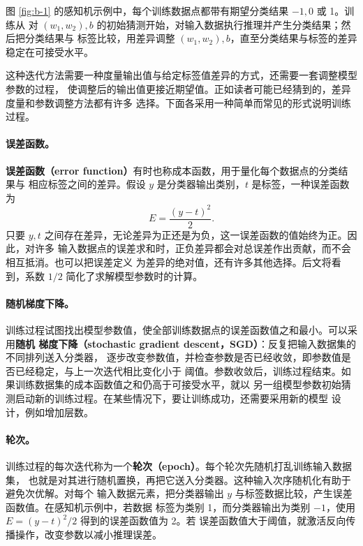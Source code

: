 图 \ref{fig:b-1} 的感知机示例中，每个训练数据点都带有期望分类结果 $-1,0$ 或 1。训练从
对 $(w_1,w_2),b$ 的初始猜测开始，对输入数据执行推理并产生分类结果；然后把分类结果与
标签比较，用差异调整 $(w_1,w_2),b$，直至分类结果与标签的差异稳定在可接受水平。

这种迭代方法需要一种度量输出值与给定标签值差异的方式，还需要一套调整模型参数的过程，
使调整后的输出值更接近期望值。正如读者可能已经猜到的，差异度量和参数调整方法都有许多
选择。下面各采用一种简单而常见的形式说明训练过程。

\paragraph{误差函数。}
\textbf{误差函数（error function）}有时也称成本函数，用于量化每个数据点的分类结果与
相应标签之间的差异。假设 $y$ 是分类器输出类别，$t$ 是标签，一种误差函数为
\begin{equation}
  E=\frac{(y-t)^2}{2}.
  \label{eq:appb-6}
\end{equation}
只要 $y,t$ 之间存在差异，无论差异为正还是为负，这一误差函数的值始终为正。因此，对许多
输入数据点的误差求和时，正负差异都会对总误差作出贡献，而不会相互抵消。也可以把误差定义
为差异的绝对值，还有许多其他选择。后文将看到，系数 $1/2$ 简化了求解模型参数时的计算。

\paragraph{随机梯度下降。}
训练过程试图找出模型参数值，使全部训练数据点的误差函数值之和最小。可以采用\textbf{随机
梯度下降（stochastic gradient descent，SGD）}：反复把输入数据集的不同排列送入分类器，
逐步改变参数值，并检查参数是否已经收敛，即参数值是否已经稳定，与上一次迭代相比变化小于
阈值。参数收敛后，训练过程结束。如果训练数据集的成本函数值之和仍高于可接受水平，就以
另一组模型参数初始猜测启动新的训练过程。在某些情况下，要让训练成功，还需要采用新的模型
设计，例如增加层数。

\paragraph{轮次。}
训练过程的每次迭代称为一个\textbf{轮次（epoch）}。每个轮次先随机打乱训练输入数据集，
也就是对其进行随机置换，再把它送入分类器。这种输入次序随机化有助于避免次优解。对每个
输入数据元素，把分类器输出 $y$ 与标签数据比较，产生误差函数值。在感知机示例中，若数据
标签为类别 1，而分类器输出为类别 $-1$，使用 $E=(y-t)^2/2$ 得到的误差函数值为 2。若
误差函数值大于阈值，就激活反向传播操作，改变参数以减小推理误差。

